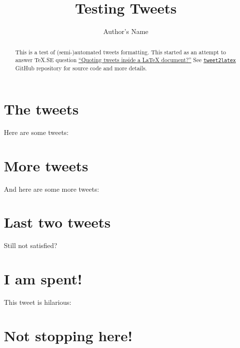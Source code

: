 \documentclass[a4paper,twocolumn]{article}
\begin{document}
\title{Testing Tweets}
\author{Author's Name}

\maketitle

\begin{abstract}
  This is a test of (semi-)automated tweets formatting. This started as an
  attempt to answer \TeX .SE question
  \href{http://tex.stackexchange.com/q/323562/28495}{``Quoting tweets inside
    a \LaTeX{} document?''} See
  \texttt{\href{https://github.com/wilx/tweet2latex}{tweet2latex}} GitHub
  repository for source code and more details.
\end{abstract}

\section{The tweets}\label{the-tweets}%
Here are some tweets:










\section{More tweets}\label{more-tweets}%
And here are some more tweets:








\section{Last two tweets}\label{last-two-tweets}%
Still not satisfied?




\section{I am spent!}\label{i-am-spent}%










This tweet is hilarious:


\section{Not stopping here!}\label{not-stopping-here}%

\end{document}
